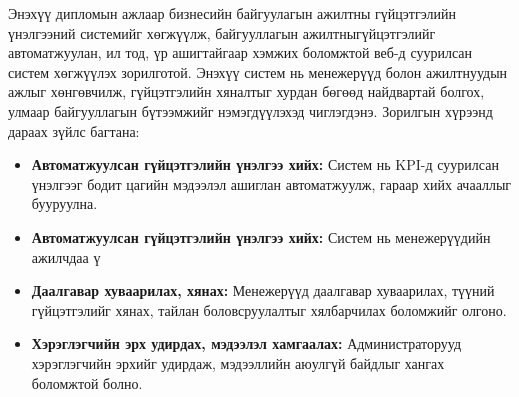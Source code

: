 Энэхүү дипломын ажлаар бизнесийн байгуулагын ажилтны гүйцэтгэлийн үнэлгээний системийг хөгжүүлж, 
байгууллагын ажилтныгүйцэтгэлийг автоматжуулан, ил тод, үр ашигтайгаар хэмжих боломжтой веб-д 
суурилсан систем хөгжүүлэх зорилготой. Энэхүү систем нь менежерүүд болон ажилтнуудын ажлыг хөнгөвчилж, 
гүйцэтгэлийн хяналтыг хурдан бөгөөд найдвартай болгох, улмаар байгууллагын бүтээмжийг нэмэгдүүлэхэд чиглэгдэнэ.
Зорилгын хүрээнд дараах зүйлс багтана:
\begin{itemize}
    \item \textbf{Автоматжуулсан гүйцэтгэлийн үнэлгээ хийх:} Систем нь KPI-д суурилсан үнэлгээг бодит цагийн мэдээлэл ашиглан автоматжуулж, гараар хийх ачааллыг бууруулна.
    \item \textbf{Автоматжуулсан гүйцэтгэлийн үнэлгээ хийх:} Систем нь менежерүүдийн ажилчдаа ү
    \item \textbf{Даалгавар хуваарилах, хянах:} Менежерүүд даалгавар хуваарилах, түүний гүйцэтгэлийг хянах, тайлан боловсруулалтыг хялбарчилах боломжийг олгоно.
    \item \textbf{Хэрэглэгчийн эрх удирдах, мэдээлэл хамгаалах:} Администраторууд хэрэглэгчийн эрхийг удирдаж, мэдээллийн аюулгүй байдлыг хангах боломжтой болно.
\end{itemize}